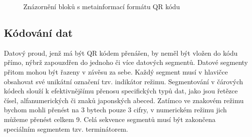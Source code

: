 \begin{figure}[H]
  \begin{center}
    \caption{Znázornění bloků s metainformací formátu QR kódu}
    \label{QRCodeFormatMetainformation}
  \end{center}
\end{figure}

\subsection{Kódování dat}
\label{kodovaniDat}

Datový proud, jenž má být QR kódem přenášen, by neměl být vložen do kódu přímo,
nýbrž zapouzdřen do jednoho či více datových segmentů. Datové segmenty přitom 
mohou být řazeny v závěsu za sebe. Každý segment musí v hlavičce obsahovat své
unikátní označení tzv. indikátor režimu. Segmentování v čárových kódech slouží
k efektivnějšímu přenosu specifických typů dat, jako jsou řetězce čísel,
alfanumerických či znaků japonských abeced. Zatímco ve znakovém režimu bychom
mohli přenést na 3 bytech pouze 3 cifry, v numerickém režimu jich můžeme přenést
celkem 9.  Celá sekvence segmentů musí být zakončena speciálním segmentem tzv.
terminátorem.

